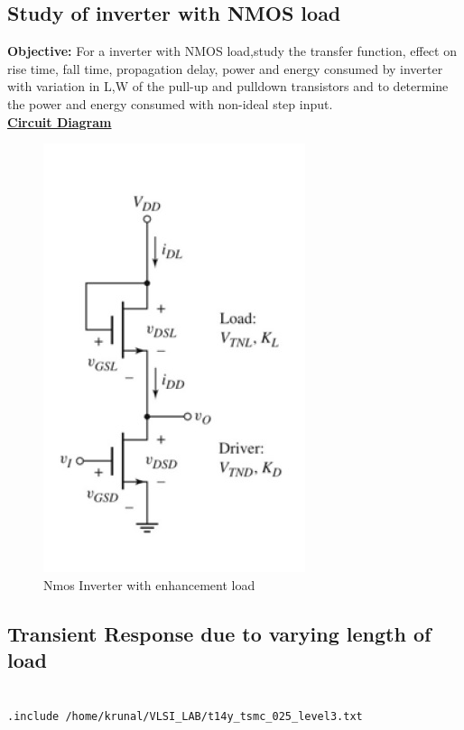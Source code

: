 \documentclass[12pt,a4paper]{article}
\begin{document}
\begin{center}
\clearpage

\subsection{Study of inverter with NMOS load}
\vspace{5pt}
{\bf{Objective:}} 
For a  inverter with NMOS load,study
the transfer function, effect on rise time, fall time, propagation delay,
power and energy consumed by  inverter with variation in  L,W 
of the pull-up and pulldown transistors and to determine the power and energy consumed with non-ideal step input.\\
\underline{\bf{Circuit Diagram}}\\
\vspace{2pt}
\begin{figure}[!ht]
\centering
\includegraphics[scale=0.37]{nmos_inverter_with_enhancement_load.jpg}

\caption[Short]{Nmos Inverter with enhancement load}
\end{figure}

\subsection{Transient Response due to varying length of load}
\begin{lstlisting}

.include /home/krunal/VLSI_LAB/t14y_tsmc_025_level3.txt


\end{lstlisting}
\end{center}
\end{document}
